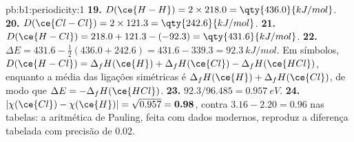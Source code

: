\begin{solution}{pb:b1:periodicity:1}
\textbf{19.} $D(\ce{H-H}) = 2 \times 218.0 = \qty{436.0}{kJ/mol}$.
\textbf{20.} $D(\ce{Cl-Cl}) = 2 \times 121.3 = \qty{242.6}{kJ/mol}$.
\textbf{21.} $D(\ce{H-Cl}) = 218.0 + 121.3 - (-92.3) = \qty{431.6}{kJ/mol}$.
\textbf{22.} $\Delta E = 431.6 - \tfrac12(436.0 + 242.6) = 431.6 - 339.3 =
\qty{92.3}{kJ/mol}$. Em símbolos, $D(\ce{H-Cl}) = \Delta_fH(\ce{H}) +
\Delta_fH(\ce{Cl}) - \Delta_fH(\ce{HCl})$, enquanto a média das ligações
simétricas é $\Delta_fH(\ce{H}) + \Delta_fH(\ce{Cl})$, de modo que $\Delta E =
-\Delta_fH(\ce{HCl})$.
\textbf{23.} $92.3/96.485 = \qty{0.957}{eV}$.
\textbf{24.} $|\chi(\ce{Cl}) - \chi(\ce{H})| = \sqrt{0.957} =
\textbf{0.98}$, contra $3.16 - 2.20 = 0.96$ nas tabelas: a aritmética de
Pauling, feita com dados modernos, reproduz a diferença tabelada com
precisão de 0.02.
\end{solution}
